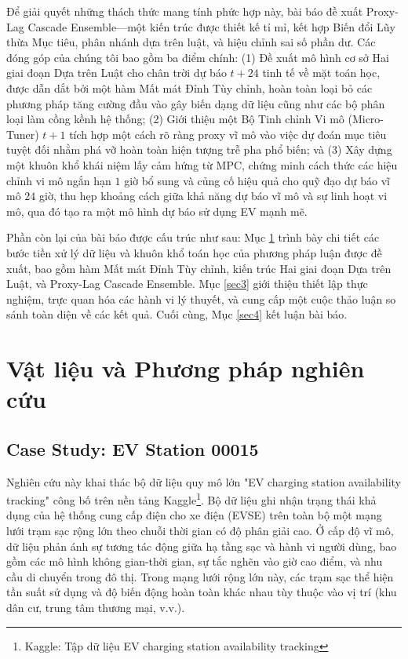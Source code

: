 \documentclass[pdflatex,sn-mathphys-num]{sn-jnl}%
\theoremstyle{thmstyleone}%
\theoremstyle{thmstyletwo}%
\theoremstyle{thmstylethree}%
\begin{document}
Để giải quyết những thách thức mang tính phức hợp này, bài báo đề xuất Proxy-Lag Cascade Ensemble---một kiến trúc được thiết kế tỉ mỉ, kết hợp Biến đổi Lũy thừa Mục tiêu, phân nhánh dựa trên luật, và hiệu chỉnh sai số phần dư. Các đóng góp của chúng tôi bao gồm ba điểm chính: (1) Đề xuất mô hình cơ sở Hai giai đoạn Dựa trên Luật cho chân trời dự báo $t+24$ tinh tế về mặt toán học, được dẫn dắt bởi một hàm Mất mát Đỉnh Tùy chỉnh, hoàn toàn loại bỏ các phương pháp tăng cường đầu vào gây biến dạng dữ liệu cũng như các bộ phân loại làm cồng kềnh hệ thống; (2) Giới thiệu một Bộ Tinh chỉnh Vi mô (Micro-Tuner) $t+1$ tích hợp một cách rõ ràng proxy vĩ mô vào việc dự đoán mục tiêu tuyệt đối nhằm phá vỡ hoàn toàn hiện tượng trễ pha phổ biến; và (3) Xây dựng một khuôn khổ khái niệm lấy cảm hứng từ MPC, chứng minh cách thức các hiệu chỉnh vi mô ngắn hạn $1$ giờ bổ sung và củng cố hiệu quả cho quỹ đạo dự báo vĩ mô $24$ giờ, thu hẹp khoảng cách giữa khả năng dự báo vĩ mô và sự linh hoạt vi mô, qua đó tạo ra một mô hình dự báo sử dụng EV mạnh mẽ.

Phần còn lại của bài báo được cấu trúc như sau: Mục \ref{sec2} trình bày chi tiết các bước tiền xử lý dữ liệu và khuôn khổ toán học của phương pháp luận được đề xuất, bao gồm hàm Mất mát Đỉnh Tùy chỉnh, kiến trúc Hai giai đoạn Dựa trên Luật, và Proxy-Lag Cascade Ensemble. Mục \ref{sec3} giới thiệu thiết lập thực nghiệm, trực quan hóa các hành vi lý thuyết, và cung cấp một cuộc thảo luận so sánh toàn diện về các kết quả. Cuối cùng, Mục \ref{sec4} kết luận bài báo.

\section{Vật liệu và Phương pháp nghiên cứu}\label{sec2}

\subsection{Case Study: EV Station 00015}
Nghiên cứu này khai thác bộ dữ liệu quy mô lớn "EV charging station availability tracking" công bố trên nền tảng Kaggle\footnote{Kaggle: Tập dữ liệu EV charging station availability tracking}. Bộ dữ liệu ghi nhận trạng thái khả dụng của hệ thống cung cấp điện cho xe điện (EVSE) trên toàn bộ một mạng lưới trạm sạc rộng lớn theo chuỗi thời gian có độ phân giải cao. Ở cấp độ vĩ mô, dữ liệu phản ánh sự tương tác động giữa hạ tầng sạc và hành vi người dùng, bao gồm các mô hình không gian-thời gian, sự tắc nghẽn vào giờ cao điểm, và nhu cầu di chuyển trong đô thị. Trong mạng lưới rộng lớn này, các trạm sạc thể hiện tần suất sử dụng và độ biến động hoàn toàn khác nhau tùy thuộc vào vị trí (khu dân cư, trung tâm thương mại, v.v.).
\end{document}

